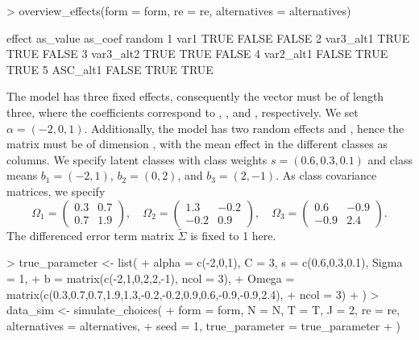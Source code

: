 \documentclass[article,shortnames]{jss}
\begin{document}
\begin{Schunk}
\begin{Sinput}
> overview_effects(form = form, re = re, alternatives = alternatives)
\end{Sinput}
\begin{Soutput}
     effect as_value as_coef random
1      var1     TRUE   FALSE  FALSE
2 var3_alt1     TRUE    TRUE  FALSE
3 var3_alt2     TRUE    TRUE  FALSE
4 var2_alt1    FALSE    TRUE   TRUE
5  ASC_alt1    FALSE    TRUE   TRUE
\end{Soutput}
\end{Schunk}

The model has three fixed effects, consequently the vector  must be of length three, where the coefficients correspond to , , and , respectively. We set $\alpha = (-2,0,1)$. Additionally, the model has two random effects  and , hence the matrix  must be of dimension , with the mean effect in the different classes as columns. We specify  latent classes with class weights $s = (0.6,0.3,0.1)$ and class means $b_1 = (-2,1)$, $b_2 = (0,2)$, and $b_3 = (2,-1)$. As class covariance matrices, we specify
$$\Omega_1 = \begin{pmatrix} 0.3 & 0.7 \\ 0.7 & 1.9 \end{pmatrix}, \quad \Omega_2 = \begin{pmatrix} 1.3 & -0.2 \\ -0.2 & 0.9 \end{pmatrix}, \quad \Omega_3 = \begin{pmatrix} 0.6 & -0.9 \\ -0.9 & 2.4 \end{pmatrix}.$$
The differenced error term matrix $\tilde{\Sigma}$ is fixed to 1 here.

\begin{Schunk}
\begin{Sinput}
> true_parameter <- list(
+    alpha = c(-2,0,1), C = 3, s = c(0.6,0.3,0.1), Sigma = 1,
+    b = matrix(c(-2,1,0,2,2,-1), ncol = 3),
+    Omega = matrix(c(0.3,0.7,0.7,1.9,1.3,-0.2,-0.2,0.9,0.6,-0.9,-0.9,2.4),
+                   ncol = 3)
+  )
> data_sim <- simulate_choices(
+    form = form, N = N, T = T, J = 2, re = re, alternatives = alternatives,
+    seed = 1, true_parameter = true_parameter
+  )
\end{Sinput}
\end{Schunk}
\end{document}
